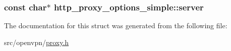 \subsubsection[{server}]{\setlength{\rightskip}{0pt plus 5cm}const char$\ast$ http\+\_\+proxy\+\_\+options\+\_\+simple\+::server}\label{structhttp__proxy__options__simple_af1518741b860c746e024778cc0e880da}


The documentation for this struct was generated from the following file\+:\begin{DoxyCompactItemize}
\item 
src/openvpn/\hyperlink{proxy_8h}{proxy.\+h}\end{DoxyCompactItemize}
